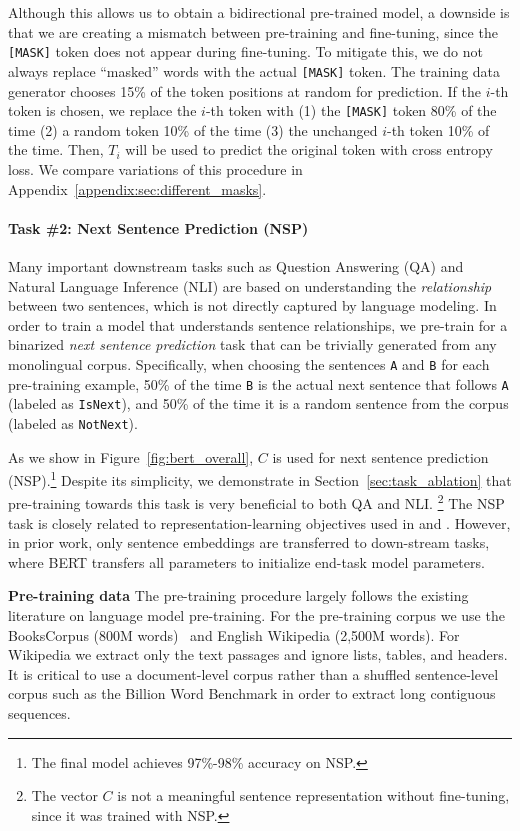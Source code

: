 Although this allows us to obtain a bidirectional pre-trained model, a downside is that we are creating a mismatch between pre-training and fine-tuning, since the {\tt [MASK]} token does not appear during fine-tuning. To mitigate this, we do not always replace ``masked'' words with the actual {\tt [MASK]} token. The training data generator chooses 15\% of the token positions at random for prediction. If the $i$-th token is chosen, we replace the $i$-th token with (1) the {\tt [MASK]} token 80\% of the time (2) a random token 10\% of the time (3) the unchanged $i$-th token 10\% of the time. Then, $T_i$ will be used to predict the original token with cross entropy loss. We compare variations of this procedure in Appendix~\ref{appendix:sec:different_masks}.

\paragraph{Task \#2: Next Sentence Prediction (NSP)} Many important downstream tasks such as Question Answering (QA) and Natural Language Inference (NLI) are based on understanding the {\it relationship} between two sentences, which is not directly captured by language modeling. In order to train a model that understands sentence relationships, we pre-train for a binarized {\it next sentence prediction} task that can be trivially generated from any monolingual corpus. Specifically, when choosing the sentences {\tt A} and {\tt B} for each pre-training example, 50\% of the time {\tt B} is the actual next sentence that follows {\tt A} (labeled as {\tt {\small IsNext}}), and 50\% of the time it is a random sentence from the corpus (labeled as {\tt {\small NotNext}}). 

As we show in Figure~\ref{fig:bert_overall}, $C$ is used for  next sentence prediction (NSP).\footnote{The final model achieves 97\%-98\% accuracy on NSP.} Despite its simplicity, we demonstrate in Section~\ref{sec:task_ablation} that pre-training towards this task is very beneficial to both QA and NLI.
\footnote{The vector $C$ is not a meaningful sentence representation without fine-tuning, since it was trained with NSP.} The NSP task is closely related to representation-learning objectives used in \citet{DBLP:journals/corr/JerniteBS17} and \citet{logeswaran2018an}. However, in prior work, only sentence embeddings are transferred to down-stream tasks, where BERT transfers all parameters to initialize end-task model parameters.

\textbf{Pre-training data} The pre-training procedure largely follows the existing literature on language model pre-training. For the pre-training corpus we use the BooksCorpus (800M words)~\cite{zhu:2015} and English Wikipedia (2,500M words). For Wikipedia we extract only the text passages and ignore lists, tables, and headers. It is critical to use a document-level corpus rather than a shuffled sentence-level corpus such as the Billion Word Benchmark \cite{chelba-etal:2013:_one} in order to extract long contiguous sequences.


